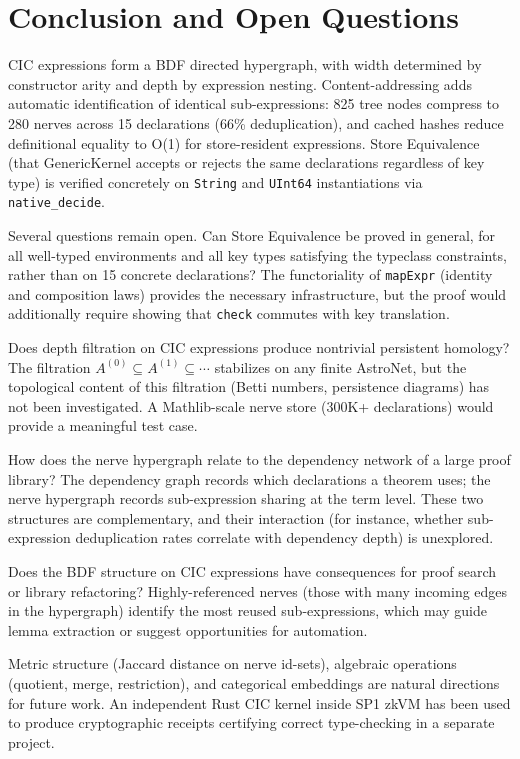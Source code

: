 \section{Conclusion and Open Questions}\label{sec:conclusion}

CIC expressions form a BDF directed hypergraph, with width determined by constructor arity and depth by expression nesting.  Content-addressing adds automatic identification of identical sub-expressions: 825 tree nodes compress to 280 nerves across 15 declarations (66\% deduplication), and cached hashes reduce definitional equality to O(1) for store-resident expressions.  Store Equivalence (that GenericKernel accepts or rejects the same declarations regardless of key type) is verified concretely on \texttt{String} and \texttt{UInt64} instantiations via \texttt{native\_decide}.

Several questions remain open.  Can Store Equivalence be proved in general, for all well-typed environments and all key types satisfying the typeclass constraints, rather than on 15 concrete declarations?  The functoriality of \texttt{mapExpr} (identity and composition laws) provides the necessary infrastructure, but the proof would additionally require showing that \texttt{check} commutes with key translation.

Does depth filtration on CIC expressions produce nontrivial persistent homology?  The filtration $A^{(0)} \subseteq A^{(1)} \subseteq \cdots$ stabilizes on any finite AstroNet, but the topological content of this filtration (Betti numbers, persistence diagrams) has not been investigated.  A Mathlib-scale nerve store (300K+ declarations) would provide a meaningful test case.

How does the nerve hypergraph relate to the dependency network of a large proof library?  The dependency graph records which declarations a theorem uses; the nerve hypergraph records sub-expression sharing at the term level.  These two structures are complementary, and their interaction (for instance, whether sub-expression deduplication rates correlate with dependency depth) is unexplored.

Does the BDF structure on CIC expressions have consequences for proof search or library refactoring?  Highly-referenced nerves (those with many incoming edges in the hypergraph) identify the most reused sub-expressions, which may guide lemma extraction or suggest opportunities for automation.

Metric structure (Jaccard distance on nerve id-sets), algebraic operations (quotient, merge, restriction), and categorical embeddings are natural directions for future work.  An independent Rust CIC kernel inside SP1 zkVM has been used to produce cryptographic receipts certifying correct type-checking in a separate project.

